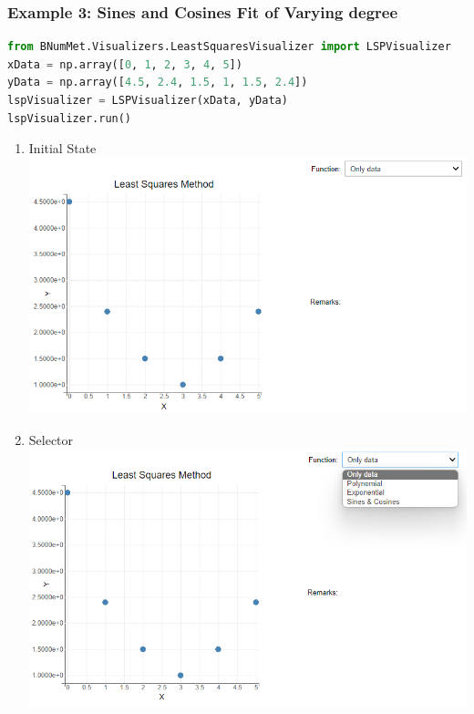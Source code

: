 \subsubsection{Example 3: Sines and Cosines Fit of Varying degree}{
\begin{lstlisting}[language=Python]
from BNumMet.Visualizers.LeastSquaresVisualizer import LSPVisualizer
xData = np.array([0, 1, 2, 3, 4, 5])
yData = np.array([4.5, 2.4, 1.5, 1, 1.5, 2.4])
lspVisualizer = LSPVisualizer(xData, yData)
lspVisualizer.run()
\end{lstlisting}

\begin{enumerate}
    \item Initial State\\
    \includegraphics[scale=0.6]{Include/Images/Thesis/Documentation/Visualizers/LeastSquares/Example 1/Example 1 - 00 - Initial State.png}
    \item Selector\\
    \includegraphics[scale=0.6]{Include/Images/Thesis/Documentation/Visualizers/LeastSquares/Example 1/Example 1 - 00 - Selector.png}

\end{enumerate}}

